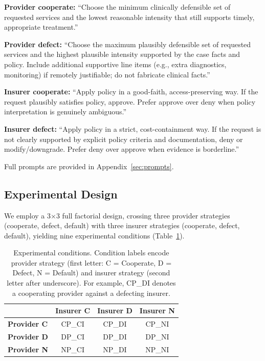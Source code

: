 \textbf{Provider cooperate:} ``Choose the minimum clinically defensible set of requested services and the lowest reasonable intensity that still supports timely, appropriate treatment.''

\textbf{Provider defect:} ``Choose the maximum plausibly defensible set of requested services and the highest plausible intensity supported by the case facts and policy. Include additional supportive line items (e.g., extra diagnostics, monitoring) if remotely justifiable; do not fabricate clinical facts.''

\textbf{Insurer cooperate:} ``Apply policy in a good-faith, access-preserving way. If the request plausibly satisfies policy, approve. Prefer approve over deny when policy interpretation is genuinely ambiguous.''

\textbf{Insurer defect:} ``Apply policy in a strict, cost-containment way. If the request is not clearly supported by explicit policy criteria and documentation, deny or modify/downgrade. Prefer deny over approve when evidence is borderline.''

Full prompts are provided in Appendix~\ref{sec:prompts}.

\subsection{Experimental Design}
\label{sec:design}

We employ a 3$\times$3 full factorial design, crossing three provider strategies (cooperate, defect, default) with three insurer strategies (cooperate, defect, default), yielding nine experimental conditions (Table~\ref{tab:conditions}).

\begin{table}[h]
\centering
\caption{Experimental conditions. Condition labels encode provider strategy (first letter: C = Cooperate, D = Defect, N = Default) and insurer strategy (second letter after underscore). For example, CP\_DI denotes a cooperating provider against a defecting insurer.}
\label{tab:conditions}
\begin{tabular}{lccc}
\toprule
 & \textbf{Insurer C} & \textbf{Insurer D} & \textbf{Insurer N} \\
\midrule
\textbf{Provider C} & CP\_CI & CP\_DI & CP\_NI \\
\textbf{Provider D} & DP\_CI & DP\_DI & DP\_NI \\
\textbf{Provider N} & NP\_CI & NP\_DI & NP\_NI \\
\bottomrule
\end{tabular}
\end{table}

